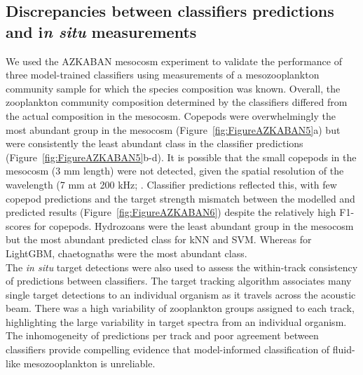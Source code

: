 \subsection{Discrepancies between classifiers predictions and i\textit{n situ} measurements}
We used the AZKABAN mesocosm experiment to validate the performance of three model-trained classifiers using measurements of a mesozooplankton community sample for which the species composition was known. Overall, the zooplankton community composition determined by the classifiers differed from the actual composition in the mesocosm. Copepods were overwhelmingly the most abundant group in the mesocosm (Figure~\ref{fig:FigureAZKABAN5}a) but were consistently the least abundant class in the classifier predictions (Figure~\ref{fig:FigureAZKABAN5}b-d). It is possible that the small copepods in the mesocosm (3 mm length) were not detected, given the spatial resolution of the wavelength (7 mm at 200 kHz; \citealt{Simmonds2008}. Classifier predictions reflected this, with few copepod predictions and the target strength mismatch between the modelled and predicted results (Figure~\ref{fig:FigureAZKABAN6}) despite the relatively high F1-scores for copepods. Hydrozoans were the least abundant group in the mesocosm but the most abundant predicted class for kNN and SVM. Whereas for LightGBM, chaetognaths were the most abundant class. \\
The \textit{in situ} target detections were also used to assess the within-track consistency of predictions between classifiers. The target tracking algorithm associates many single target detections to an individual organism as it travels across the acoustic beam. There was a high variability of zooplankton groups assigned to each track, highlighting the large variability in target spectra from an individual organism. The inhomogeneity of predictions per track and poor agreement between classifiers provide compelling evidence that model-informed classification of fluid-like mesozooplankton is unreliable. 

